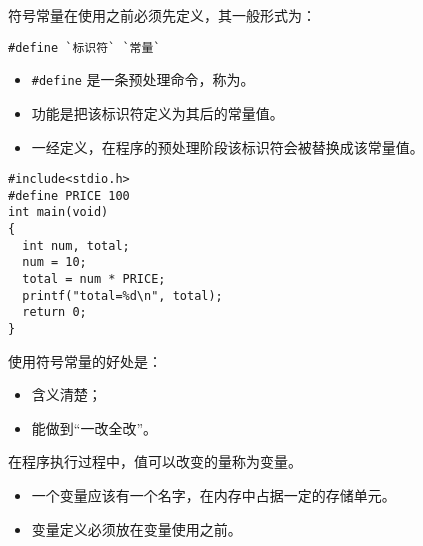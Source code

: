 \begin{frame}[fragile]

  符号常量在使用之前必须先定义，其一般形式为：
\begin{lstlisting}
#define `标识符` `常量`
\end{lstlisting}
\vspace{0.05in}

\begin{itemize}
\item  \lstinline|#define| 是一条预处理命令，称为。\\[0.1in]
\item 功能是把该标识符定义为其后的常量值。\\[0.1in]
\item 一经定义，在程序的预处理阶段该标识符会被替换成该常量值。
\end{itemize}
\end{frame}

\begin{frame}[fragile]
\begin{lstlisting}
#include<stdio.h>
#define PRICE 100
int main(void)
{
  int num, total;  
  num = 10;
  total = num * PRICE;
  printf("total=%d\n", total);  
  return 0;
}
\end{lstlisting}


\pause 
使用符号常量的好处是：\vspace{0.05in}

\begin{itemize}
\item 含义清楚；\\[0.1in]
\item 能做到“一改全改”。
\end{itemize}
\end{frame}


\begin{frame}
\begin{defn}[\blue{变量}]{}
在程序执行过程中，值可以改变的量称为变量。
\end{defn}

\begin{itemize}
\item
一个变量应该有一个名字，在内存中占据一定的存储单元。\\[0.1in]
\item
变量定义必须放在变量使用之前。
\end{itemize}
\end{frame}


